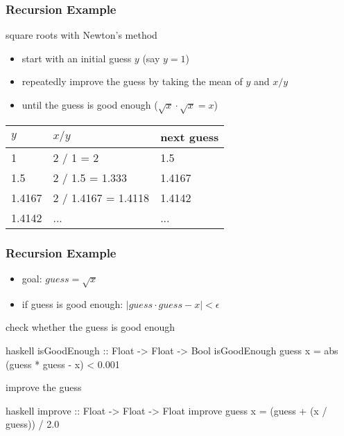 \documentclass[dvipsnames]{beamer}
\theoremstyle{plain}
\begin{document}
\begin{frame}
  \frametitle{Recursion Example}

  \begin{exampleblock}{square roots with Newton's method}
    \begin{itemize}
      \item start with an initial guess $y$ (say $y = 1$)
      \item repeatedly improve the guess by taking the mean of $y$
        and $x / y$
      \item until the guess is good enough ($\sqrt x \cdot \sqrt x = x$)
    \end{itemize}

    \begin{center}
      \begin{tabular}{lll}
      $y$      & $x / y$             & next guess\\\hline
      1        & 2 / 1 = 2           & 1.5\\
      1.5      & 2 / 1.5 = 1.333     & 1.4167\\
      1.4167   & 2 / 1.4167 = 1.4118 & 1.4142\\
      1.4142   & ...                 & ...
      \end{tabular}
    \end{center}
  \end{exampleblock}
\end{frame}

\begin{frame}[fragile]
  \frametitle{Recursion Example}

  \begin{itemize}
    \item goal: $guess = \sqrt x$
    \item if guess is good enough: $|guess \cdot guess - x| < \epsilon$
  \end{itemize}

  \pause
  \begin{exampleblock}{check whether the guess is good enough}
    \begin{pygments}{haskell}
isGoodEnough :: Float -> Float -> Bool
isGoodEnough guess x = abs (guess * guess - x) < 0.001
    \end{pygments}
  \end{exampleblock}

  \pause
  \begin{exampleblock}{improve the guess}
    \begin{pygments}{haskell}
improve :: Float -> Float -> Float
improve guess x = (guess + (x / guess)) / 2.0
    \end{pygments}
  \end{exampleblock}
\end{frame}
\end{document}
